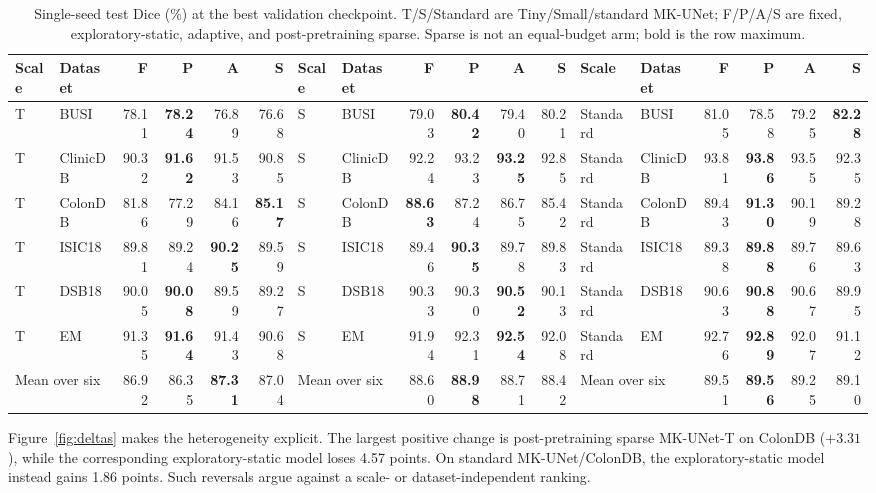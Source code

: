 \documentclass[conference]{IEEEtran}
\begin{document}
\begin{table}[t]
\caption{Single-seed test Dice (\%) at the best validation checkpoint. T/S/Standard are Tiny/Small/standard MK-UNet; F/P/A/S are fixed, exploratory-static, adaptive, and post-pretraining sparse. Sparse is not an equal-budget arm; bold is the row maximum.}
\label{tab:allresults}
\centering
\footnotesize
\setlength{\tabcolsep}{3.6pt}
\begin{tabular}{llrrrr|llrrrr|llrrrr}
\toprule
Scale & Dataset & F & P & A & S & Scale & Dataset & F & P & A & S & Scale & Dataset & F & P & A & S \\
\midrule
T & BUSI     & 78.11 & \textbf{78.24} & 76.89 & 76.68 &
S & BUSI     & 79.03 & \textbf{80.42} & 79.40 & 80.21 &
Standard & BUSI  & 81.05 & 78.58 & 79.25 & \textbf{82.28} \\
T & ClinicDB & 90.32 & \textbf{91.62} & 91.53 & 90.85 &
S & ClinicDB & 92.24 & 93.23 & \textbf{93.25} & 92.85 &
Standard & ClinicDB & 93.81 & \textbf{93.86} & 93.55 & 92.35 \\
T & ColonDB  & 81.86 & 77.29 & 84.16 & \textbf{85.17} &
S & ColonDB  & \textbf{88.63} & 87.24 & 86.75 & 85.42 &
Standard & ColonDB & 89.43 & \textbf{91.30} & 90.19 & 89.28 \\
T & ISIC18   & 89.81 & 89.24 & \textbf{90.25} & 89.59 &
S & ISIC18   & 89.46 & \textbf{90.35} & 89.78 & 89.83 &
Standard & ISIC18 & 89.38 & \textbf{89.88} & 89.76 & 89.63 \\
T & DSB18    & 90.05 & \textbf{90.08} & 89.59 & 89.27 &
S & DSB18    & 90.33 & 90.30 & \textbf{90.52} & 90.13 &
Standard & DSB18 & 90.63 & \textbf{90.88} & 90.67 & 89.95 \\
T & EM       & 91.35 & \textbf{91.64} & 91.43 & 90.68 &
S & EM       & 91.94 & 92.31 & \textbf{92.54} & 92.08 &
Standard & EM    & 92.76 & \textbf{92.89} & 92.07 & 91.12 \\
\midrule
\multicolumn{2}{l}{Mean over six} & 86.92 & 86.35 & \textbf{87.31} & 87.04 &
\multicolumn{2}{l}{Mean over six} & 88.60 & \textbf{88.98} & 88.71 & 88.42 &
\multicolumn{2}{l}{Mean over six} & 89.51 & \textbf{89.56} & 89.25 & 89.10 \\
\bottomrule
\end{tabular}
\end{table}

Figure~\ref{fig:deltas} makes the heterogeneity explicit. The largest positive change is post-pretraining sparse MK-UNet-T on ColonDB ($+3.31$), while the corresponding exploratory-static model loses 4.57 points. On standard MK-UNet/ColonDB, the exploratory-static model instead gains 1.86 points. Such reversals argue against a scale- or dataset-independent ranking.
\end{document}
